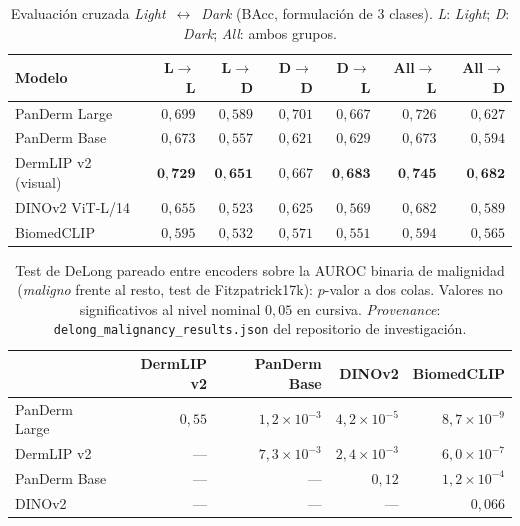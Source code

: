 \begin{table}[H]
\centering
\footnotesize
\setlength{\tabcolsep}{4pt}
\caption{Evaluación cruzada \emph{Light}~$\leftrightarrow$~\emph{Dark}
(BAcc, formulación de $3$ clases). \emph{L}: \emph{Light};
\emph{D}: \emph{Dark}; \emph{All}: ambos grupos.}
\label{tab:cross-eval}
\begin{tabular}{lrrrrrr}
\hline
Modelo                    & L$\to$L       & L$\to$D       & D$\to$D       & D$\to$L       & All$\to$L     & All$\to$D \\
\hline
PanDerm Large             & $0{,}699$     & $0{,}589$     & $0{,}701$     & $0{,}667$     & $0{,}726$     & $0{,}627$ \\
PanDerm Base              & $0{,}673$     & $0{,}557$     & $0{,}621$     & $0{,}629$     & $0{,}673$     & $0{,}594$ \\
DermLIP v2 (visual)       & $\mathbf{0{,}729}$ & $\mathbf{0{,}651}$ & $0{,}667$ & $\mathbf{0{,}683}$ & $\mathbf{0{,}745}$ & $\mathbf{0{,}682}$ \\
DINOv2 ViT-L/14           & $0{,}655$     & $0{,}523$     & $0{,}625$     & $0{,}569$     & $0{,}682$     & $0{,}589$ \\
BiomedCLIP                & $0{,}595$     & $0{,}532$     & $0{,}571$     & $0{,}551$     & $0{,}594$     & $0{,}565$ \\
\hline
\end{tabular}
\end{table}

\begin{table}[H]
\centering
\footnotesize
\setlength{\tabcolsep}{4pt}
\renewcommand{\arraystretch}{0.95}
\caption{Test de DeLong pareado entre encoders sobre la AUROC binaria
de malignidad (\emph{maligno} frente al resto, test de Fitzpatrick17k):
$p$-valor a dos colas. Valores no significativos al nivel nominal
$0{,}05$ en cursiva. \emph{Provenance}:
\texttt{delong\_malignancy\_results.json} del repositorio de
investigación.}
\label{tab:delong-pares}
\begin{tabular}{lrrrr}
\hline
                & DermLIP v2          & PanDerm Base        & DINOv2              & BiomedCLIP \\
\hline
PanDerm Large   & \emph{$0{,}55$}     & $1{,}2\times 10^{-3}$ & $4{,}2\times 10^{-5}$ & $8{,}7\times 10^{-9}$ \\
DermLIP v2      & ---                 & $7{,}3\times 10^{-3}$ & $2{,}4\times 10^{-3}$ & $6{,}0\times 10^{-7}$ \\
PanDerm Base    & ---                 & ---                 & \emph{$0{,}12$}     & $1{,}2\times 10^{-4}$ \\
DINOv2          & ---                 & ---                 & ---                 & \emph{$0{,}066$} \\
\hline
\end{tabular}
\end{table}
